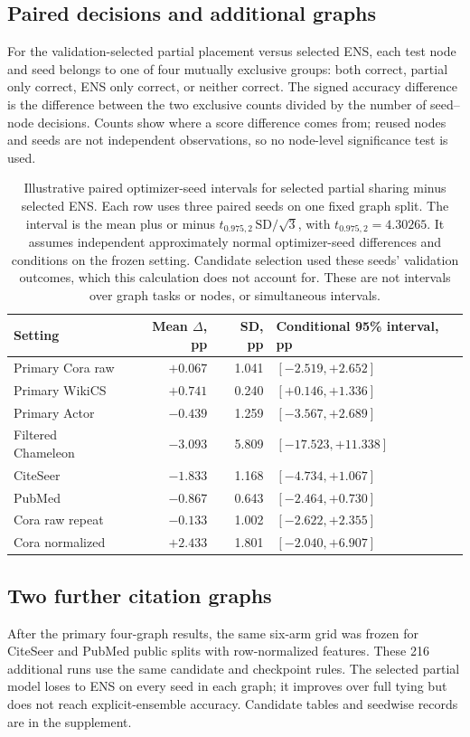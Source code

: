 \subsection{Paired decisions and additional graphs}\label{app:paired-decisions}
For the validation-selected partial placement versus selected ENS, each
test node and seed belongs to one of four mutually exclusive groups:
both correct, partial only correct, ENS only correct, or neither correct.
The signed accuracy difference is the difference between the two
exclusive counts divided by the number of seed--node decisions. Counts
show where a score difference comes from; reused nodes and seeds are not
independent observations, so no node-level significance test is used.

\begin{table}[t]
\centering\small
\caption{Illustrative paired optimizer-seed intervals for selected partial sharing minus selected ENS. Each row uses three paired seeds on one fixed graph split. The interval is the mean plus or minus $t_{0.975,2}\,\mathrm{SD}/\sqrt{3}$, with $t_{0.975,2}=4.30265$. It assumes independent approximately normal optimizer-seed differences and conditions on the frozen setting. Candidate selection used these seeds' validation outcomes, which this calculation does not account for. These are not intervals over graph tasks or nodes, or simultaneous intervals.}
\label{tab:conditional-seed-intervals}
\setlength{\tabcolsep}{4pt}
\begin{tabular}{lrrl}
\toprule
Setting & Mean $\Delta$, pp & SD, pp & Conditional 95\% interval, pp\\
\midrule
Primary Cora raw & $+0.067$ & 1.041 & $[-2.519,+2.652]$\\
Primary WikiCS & $+0.741$ & 0.240 & $[+0.146,+1.336]$\\
Primary Actor & $-0.439$ & 1.259 & $[-3.567,+2.689]$\\
Filtered Chameleon & $-3.093$ & 5.809 & $[-17.523,+11.338]$\\
CiteSeer & $-1.833$ & 1.168 & $[-4.734,+1.067]$\\
PubMed & $-0.867$ & 0.643 & $[-2.464,+0.730]$\\
Cora raw repeat & $-0.133$ & 1.002 & $[-2.622,+2.355]$\\
Cora normalized & $+2.433$ & 1.801 & $[-2.040,+6.907]$\\
\bottomrule
\end{tabular}
\end{table}

\subsection{Two further citation graphs}\label{app:planetoid-confirmation}
After the primary four-graph results, the same six-arm grid was frozen
for CiteSeer and PubMed public splits with row-normalized features.
These 216 additional runs use the same candidate and checkpoint rules.
The selected partial model loses to ENS on every seed in each graph;
it improves over full tying but does not reach explicit-ensemble
accuracy. Candidate tables and seedwise records are in the supplement.

